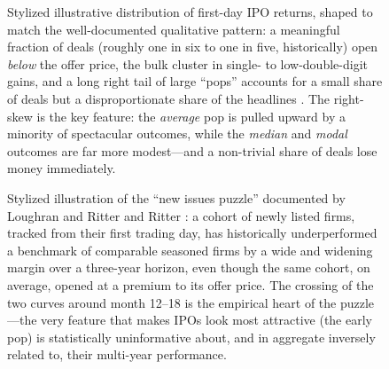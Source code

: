 \documentclass[conference]{IEEEtran}
\begin{document}
\begin{figure}[!t]
\centering
{}
\caption{Stylized illustrative distribution of first-day IPO returns, shaped to match the well-documented qualitative pattern: a meaningful fraction of deals (roughly one in six to one in five, historically) open \emph{below} the offer price, the bulk cluster in single- to low-double-digit gains, and a long right tail of large ``pops'' accounts for a small share of deals but a disproportionate share of the headlines \cite{ibbotson1975,ritter1991}. The right-skew is the key feature: the \emph{average} pop is pulled upward by a minority of spectacular outcomes, while the \emph{median} and \emph{modal} outcomes are far more modest---and a non-trivial share of deals lose money immediately.}
\label{fig:popdist}
\end{figure}

\begin{figure}[!t]
\centering
{}
\caption{Stylized illustration of the ``new issues puzzle'' documented by Loughran and Ritter \cite{loughranritter1995} and Ritter \cite{ritter1991}: a cohort of newly listed firms, tracked from their first trading day, has historically underperformed a benchmark of comparable seasoned firms by a wide and widening margin over a three-year horizon, even though the same cohort, on average, opened at a premium to its offer price. The crossing of the two curves around month 12--18 is the empirical heart of the puzzle---the very feature that makes IPOs look most attractive (the early pop) is statistically uninformative about, and in aggregate inversely related to, their multi-year performance.}
\label{fig:longrun}
\end{figure}
\end{document}
